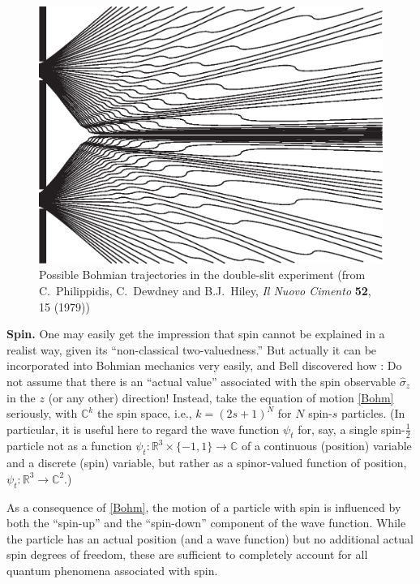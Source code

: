 \documentclass[12pt]{report}
\newcommand{\RRR}{\mathbb{R}}
\newcommand{\CCC}{\mathbb{C}}
\begin{document}
\begin{figure}[ht]\begin{center}\includegraphics[width=.5 \textwidth]
{Grafik1.eps}\end{center}\caption{Possible Bohmian trajectories in the double-slit experiment (from C.\ Philippidis, C.\ Dewdney and B.J.\ Hiley, {\em Il Nuovo Cimento}
{\bf 52}, 15 (1979))}\end{figure}

\bigskip

\noindent\textbf{Spin.}
One may easily get the impression that spin cannot be explained in a
realist way, given its ``non-classical two-valuedness.'' But actually it can be incorporated into Bohmian mechanics very easily, and Bell discovered how \cite{Bell66}: Do not assume that there is an ``actual value'' associated with the spin observable $\hat\sigma_z$ in the $z$ (or any other) direction!  Instead, take the equation of motion \eqref{Bohm} seriously, with $\CCC^k$ the spin space, i.e., $k=(2s+1)^N$ for $N$ spin-$s$ particles. (In particular, it is useful here to regard the wave function $\psi_t$ for, say, a single spin-$\tfrac{1}{2}$ particle not as a function $\psi_t:\RRR^3\times \{-1,1\} \to \CCC$ 
of a continuous (position) variable and a discrete (spin) variable, but rather as a spinor-valued function of position, $\psi_t: \RRR^3\to\CCC^2$.)

As a consequence of \eqref{Bohm}, the motion of a particle with spin is influenced by both the ``spin-up'' and the ``spin-down'' component of the wave function. While the particle has an actual position (and a wave function) but no additional actual spin degrees of freedom, these are sufficient to completely account for all quantum  phenomena associated with spin. %

\bigskip
\end{document}
